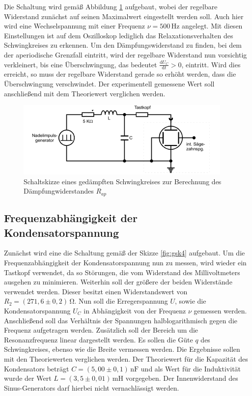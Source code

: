 Die Schaltung wird gemäß Abbildung \ref{fig:gsk3} aufgebaut, wobei der regelbare Widerstand zunächst
auf seinen Maximalwert eingestellt werden soll. Auch hier wird eine Wechselspannung mit einer
Frequenz $\nu = 500\, \si{\hertz}$ angelegt. Mit diesen Einstellungen ist auf dem Oszilloskop
lediglich das Relaxationsverhalten des Schwingkreises zu erkennen. Um den Dämpfungswiderstand 
zu finden, bei dem der aperiodische Grenzfall eintritt, wird der regelbare Widerstand nun vorsichtig
verkleinert, bis eine Überschwingung, das bedeutet $\frac{\mathrm{d}U_C}{\mathrm{d}t} > 0$, eintritt.
Wird dies erreicht, so muss der regelbare Widerstand gerade so erhöht werden, dass die Überschwingung
verschwindet. Der experimentell gemessene Wert soll anschließend mit dem Theoriewert verglichen werden.

\begin{figure}[H]
  \centering
  \includegraphics{content/aufgabeB.png}
  \caption{Schaltskizze eines gedämpften Schwingkreises zur Berechnung des Dämpfungwiderstandes $R_{ap}$ \cite{sample354}}
  \label{fig:gsk3}
\end{figure}


\subsection{Frequenzabhängigkeit der Kondensatorspannung}

Zunächst wird eine die Schaltung gemäß der Skizze \ref{fig:gsk4} aufgebaut. Um die Frequenzabhängigkeit 
der Kondensatorspannung nun zu messen, wird wieder ein Tastkopf verwendet, da so Störungen, die vom Widerstand
des Millivoltmeters ausgehen zu minimieren. Weiterhin soll der größere der beiden Widerstände verwendet werden. Dieser 
besitzt einen Widerstandswert von $R_2 = (271,6 \pm 0,2)\, \si{\ohm}$. 
Nun soll die Erregerspannung $U$, sowie die Kondensatorspannung $U_C$ in Abhängigkeit von der Frequenz $\nu$
gemessen werden. Anschließend soll das Verhältnis der Spannungen halblogarithmisch gegen die Frequenz aufgetragen werden.
Zusätzlich soll der Bereich um die Resonanzfrequenz linear dargestellt werden. Es sollen die Güte $q$ des
Schwingkreises, ebenso wie die Breite vermessen werden. Die Ergebnisse sollen mit den Theoriewerten 
verglichen werden. Der Theoriewert für die Kapazität des Kondensators beträgt $C = (5,00 \pm 0,1)\, \si{\nano\farad}$
und als Wert für die Induktivität wurde der Wert $L = (3,5 \pm 0,01)\, \si{\milli\henry}$ vorgegeben.
Der Innenwiderstand des Sinus-Generators darf hierbei nicht vernachlässigt werden.

